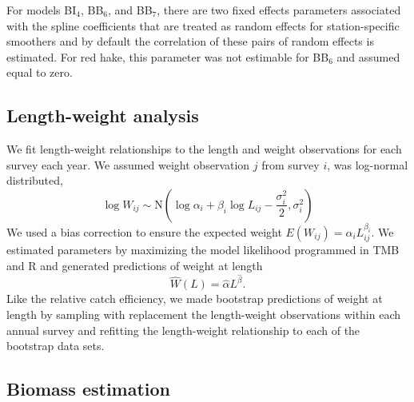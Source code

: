 \documentclass[
  12pt,
]{article}
\begin{document}
For models BI\(_4\), BB\(_6\), and BB\(_7\), there are two fixed effects
parameters associated with the spline coefficients that are treated as
random effects for station-specific smoothers and by default the
correlation of these pairs of random effects is estimated. For red hake,
this parameter was not estimable for BB\(_6\) and assumed equal to zero.

\hypertarget{length-weight-analysis}{%
\subsection{Length-weight analysis}\label{length-weight-analysis}}

We fit length-weight relationships to the length and weight observations
for each survey each year. We assumed weight observation \(j\) from
survey \(i\), was log-normal distributed, \begin{equation}\label{wal}
 \log W_{ij} \sim \text{N}\left(\log \alpha_i + \beta_i \log L_{ij} - \frac{\sigma_i^2}{2}, \sigma_i^2\right)
\end{equation} We used a bias correction to ensure the expected weight
\(E(W_{ij})= \alpha_i L_{ij}^{\beta_i}\). We estimated parameters by
maximizing the model likelihood programmed in TMB
\citep{kristensenetal16} and R \citep{R19} and generated predictions of
weight at length \begin{equation}\label{predwal}
\widehat W(L) = \widehat \alpha L^{\widehat \beta}.
\end{equation} Like the relative catch efficiency, we made bootstrap
predictions of weight at length by sampling with replacement the
length-weight observations within each annual survey and refitting the
length-weight relationship to each of the bootstrap data sets.

\hypertarget{biomass-estimation}{%
\subsection{Biomass estimation}\label{biomass-estimation}}
\end{document}
